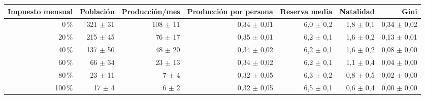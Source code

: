 \begin{tabular}{rrrrrrr}
\toprule
Impuesto mensual & Población & Producción/mes & Producción por persona & Reserva media & Natalidad & Gini \\
\midrule
0\,\% & 321 $\pm$ 31 & 108 $\pm$ 11 & 0,34 $\pm$ 0,01 & 6,0 $\pm$ 0,2 & 1,8 $\pm$ 0,1 & 0,34 $\pm$ 0,02 \\
20\,\% & 215 $\pm$ 45 & 76 $\pm$ 17 & 0,35 $\pm$ 0,01 & 6,2 $\pm$ 0,1 & 1,6 $\pm$ 0,2 & 0,13 $\pm$ 0,01 \\
40\,\% & 137 $\pm$ 50 & 48 $\pm$ 20 & 0,34 $\pm$ 0,02 & 6,2 $\pm$ 0,1 & 1,6 $\pm$ 0,2 & 0,08 $\pm$ 0,00 \\
60\,\% & 66 $\pm$ 34 & 23 $\pm$ 13 & 0,34 $\pm$ 0,02 & 6,2 $\pm$ 0,1 & 1,1 $\pm$ 0,4 & 0,04 $\pm$ 0,00 \\
80\,\% & 23 $\pm$ 11 & 7 $\pm$ 4 & 0,32 $\pm$ 0,05 & 6,3 $\pm$ 0,2 & 0,8 $\pm$ 0,5 & 0,02 $\pm$ 0,00 \\
100\,\% & 17 $\pm$ 4 & 6 $\pm$ 2 & 0,32 $\pm$ 0,05 & 6,5 $\pm$ 0,1 & 0,6 $\pm$ 0,4 & 0,00 $\pm$ 0,00 \\
\bottomrule
\end{tabular}
